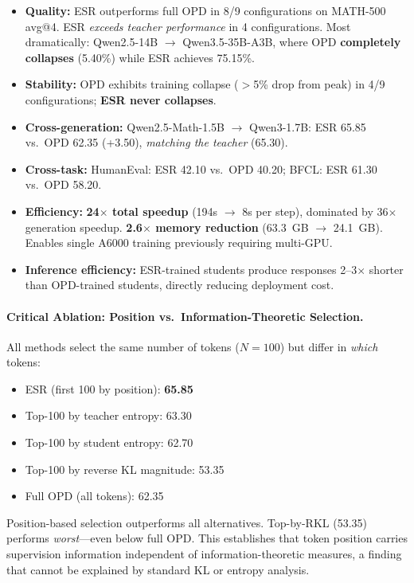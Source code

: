\documentclass[11pt,a4paper]{article}
\begin{document}
\begin{itemize}[nosep]
    \item \textbf{Quality:} ESR outperforms full OPD in 8/9 configurations on MATH-500 avg@4. ESR \emph{exceeds teacher performance} in 4 configurations. Most dramatically: Qwen2.5-14B $\to$ Qwen3.5-35B-A3B, where OPD \textbf{completely collapses} (5.40\%) while ESR achieves 75.15\%.
    \item \textbf{Stability:} OPD exhibits training collapse ($>$5\% drop from peak) in 4/9 configurations; \textbf{ESR never collapses}.
    \item \textbf{Cross-generation:} Qwen2.5-Math-1.5B $\to$ Qwen3-1.7B: ESR 65.85 vs.\ OPD 62.35 (+3.50), \emph{matching the teacher} (65.30).
    \item \textbf{Cross-task:} HumanEval: ESR 42.10 vs.\ OPD 40.20; BFCL: ESR 61.30 vs.\ OPD 58.20.
    \item \textbf{Efficiency:} \textbf{24$\times$ total speedup} (194s $\to$ 8s per step), dominated by 36$\times$ generation speedup. \textbf{2.6$\times$ memory reduction} (63.3~GB $\to$ 24.1~GB). Enables single A6000 training previously requiring multi-GPU.
    \item \textbf{Inference efficiency:} ESR-trained students produce responses 2--3$\times$ shorter than OPD-trained students, directly reducing deployment cost.
\end{itemize}

\paragraph{Critical Ablation: Position vs.\ Information-Theoretic Selection.}
All methods select the same number of tokens ($N=100$) but differ in \emph{which} tokens:
\begin{itemize}[nosep]
    \item ESR (first 100 by position): \textbf{65.85}
    \item Top-100 by teacher entropy: 63.30
    \item Top-100 by student entropy: 62.70
    \item Top-100 by reverse KL magnitude: 53.35
    \item Full OPD (all tokens): 62.35
\end{itemize}
Position-based selection outperforms all alternatives. Top-by-RKL (53.35) performs \emph{worst}---even below full OPD. This establishes that token position carries supervision information independent of information-theoretic measures, a finding that cannot be explained by standard KL or entropy analysis.
\end{document}
